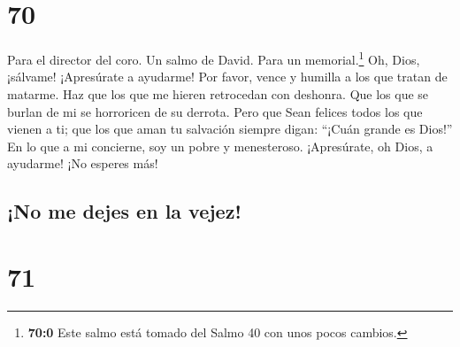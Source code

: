 \hypertarget{section-69}{%
\section{70}\label{section-69}}

Para el director del coro. Un salmo de David. Para un
memorial.\footnote{\textbf{70:0} Este salmo está tomado del Salmo 40 con
  unos pocos cambios.}  Oh, Dios, ¡sálvame! ¡Apresúrate a
ayudarme!  Por favor, vence y humilla a los que tratan de
matarme. Haz que los que me hieren retrocedan con deshonra.
 Que los que se burlan de mi se horroricen de su derrota.
 Pero que Sean felices todos los que vienen a ti; que los
que aman tu salvación siempre digan: ``¡Cuán grande es Dios!''
 En lo que a mi concierne, soy un pobre y menesteroso.
¡Apresúrate, oh Dios, a ayudarme! ¡No esperes más!

\hypertarget{no-me-dejes-en-la-vejez}{%
\subsection{¡No me dejes en la vejez!}\label{no-me-dejes-en-la-vejez}}

\hypertarget{section-70}{%
\section{71}\label{section-70}}

